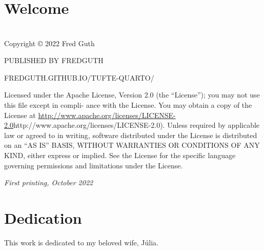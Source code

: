 \documentclass[
  letterpaper,
]{tufte-book}
\renewcommand*\contentsname{Table of contents}
\newcommand\contentsname{Table of contents}
\begin{document}
\ifdefined\Shaded\renewenvironment{Shaded}{\begin{tcolorbox}[borderline west={3pt}{0pt}{shadecolor}, interior hidden, boxrule=0pt, enhanced, breakable, sharp corners, frame hidden]}{\end{tcolorbox}}\fi

\renewcommand*\contentsname{Contents}
{
\hypersetup{linkcolor=}
\setcounter{tocdepth}{2}
\tableofcontents
}
\mainmatter
{}

\hypertarget{welcome}{%
\chapter*{Welcome}\label{welcome}}



\hypertarget{section}{%
\chapter{}\label{section}}

\vfill

Copyright © 2022 Fred Guth

PUBLISHED BY FREDGUTH

FREDGUTH.GITHUB.IO/TUFTE-QUARTO/

Licensed under the Apache License, Version 2.0 (the ``License''); you
may not use this file except in compli- ance with the License. You may
obtain a copy of the License at
\href{\%5B}{http://www.apache.org/licenses/LICENSE-2.0}http://www.apache.org/licenses/LICENSE-2.0).
Unless required by applicable law or agreed to in writing, software
distributed under the License is distributed on an ``AS IS'' BASIS,
WITHOUT WARRANTIES OR CONDITIONS OF ANY KIND, either express or implied.
See the License for the specific language governing permissions and
limitations under the License.

\emph{First printing, October 2022}


\hypertarget{dedication}{%
\chapter{Dedication}\label{dedication}}

This work is dedicated to my beloved wife, Júlia.

\vspace{4cm}
\end{document}
